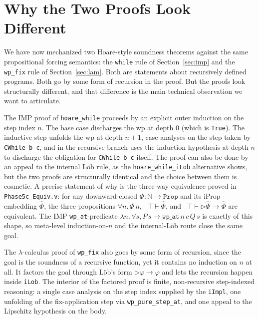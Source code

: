 \section{Why the Two Proofs Look Different}
\label{sec:imp-vs-lam}

We have now mechanized two Hoare-style soundness theorems against
the same propositional forcing semantics: the \texttt{while} rule
of Section~\ref{sec:imp} and the \texttt{wp\_fix} rule of
Section~\ref{sec:lam}.  Both are statements about recursively
defined programs.  Both go by some form of recursion in the proof.
But the proofs look structurally different, and that difference is
the main technical observation we want to articulate.

The IMP proof of \texttt{hoare\_while} proceeds by an explicit outer
induction on the step index $n$.  The base case discharges the wp at
depth $0$ (which is \texttt{True}).  The inductive step unfolds the
wp at depth $n+1$, case-analyses on the step taken by \texttt{CWhile b
c}, and in the recursive branch uses the induction hypothesis at
depth $n$ to discharge the obligation for \texttt{CWhile b c} itself.
The proof can also be done by an appeal to the internal Löb rule, as
the \texttt{hoare\_while\_iLob} alternative shows, but the two
proofs are structurally identical and the choice between them is
cosmetic.  A precise statement of why is the three-way equivalence
proved in \texttt{Phase5c\_Equiv.v}: for any downward-closed
$\Phi : \mathbb{N} \to \mathtt{Prop}$ and its iProp embedding
$\widehat{\Phi}$, the three propositions
$\forall n.\, \Phi\, n$, \,
$\top \vdash \widehat{\Phi}$, and \,
$\top \vdash \triangleright \widehat{\Phi} \to \widehat{\Phi}$
are equivalent.  The IMP \texttt{wp\_at}-predicate
$\lambda n.\, \forall s, P\, s \to \mathtt{wp\_at}\, n\, c\, Q\, s$ is
exactly of this shape, so meta-level induction-on-$n$ and the
internal-L\"ob route close the same goal.

The $\lambda$-calculus proof of \texttt{wp\_fix} also goes by some
form of recursion, since the goal is the soundness of a recursive
function, yet it contains no induction on $n$ at all.  It factors the goal through Löb's form
$\triangleright \varphi \to \varphi$ and lets the recursion happen
inside \texttt{iLob}.  The interior of the factored proof is finite,
non-recursive step-indexed reasoning: a single case analysis on the
step index supplied by the \texttt{iImpl}, one unfolding of the
fix-application step via \texttt{wp\_pure\_step\_at}, and one
appeal to the Lipschitz hypothesis on the body.

